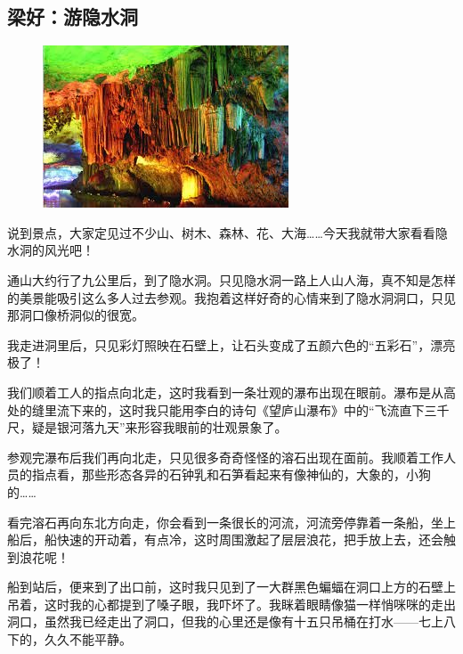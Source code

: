 \vspace{10pt}

{\centering\subsection*{梁好：游隐水洞}}


\renewcommand{\leftmark}{梁好：游隐水洞}

\begin{figure}[htbp]

\centering

\includegraphics[width = .5\textwidth]{./ch/29.jpg}

\end{figure}



说到景点，大家定见过不少山、树木、森林、花、大海……今天我就带大家看看隐水洞的风光吧！


通山大约行了九公里后，到了隐水洞。只见隐水洞一路上人山人海，真不知是怎样的美景能吸引这么多人过去参观。我抱着这样好奇的心情来到了隐水洞洞口，只见那洞口像桥洞似的很宽。


我走进洞里后，只见彩灯照映在石壁上，让石头变成了五颜六色的“五彩石”，漂亮极了！


我们顺着工人的指点向北走，这时我看到一条壮观的瀑布出现在眼前。瀑布是从高处的缝里流下来的，这时我只能用李白的诗句《望庐山瀑布》中的“飞流直下三千尺，疑是银河落九天”来形容我眼前的壮观景象了。


参观完瀑布后我们再向北走，只见很多奇奇怪怪的溶石出现在面前。我顺着工作人员的指点看，那些形态各异的石钟乳和石笋看起来有像神仙的，大象的，小狗的……

看完溶石再向东北方向走，你会看到一条很长的河流，河流旁停靠着一条船，坐上船后，船快速的开动着，有点冷，这时周围激起了层层浪花，把手放上去，还会触到浪花呢！


船到站后，便来到了出口前，这时我只见到了一大群黑色蝙蝠在洞口上方的石壁上吊着，这时我的心都提到了嗓子眼，我吓坏了。我眯着眼睛像猫一样悄咪咪的走出洞口，虽然我已经走出了洞口，但我的心里还是像有十五只吊桶在打水——七上八下的，久久不能平静。




